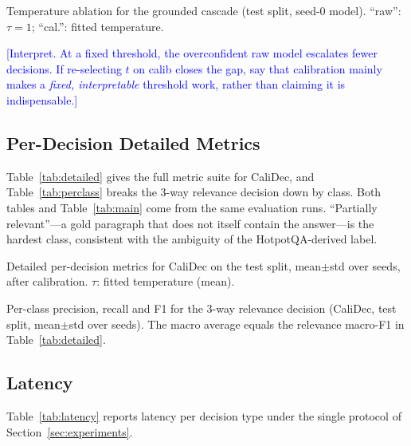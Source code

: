 \documentclass[twocolumn]{ICCKjournal}
\newcommand{\revnote}[1]{\textcolor{blue}{[#1]}}
\begin{document}
\begin{table}[H]
\caption{Temperature ablation for the grounded cascade (test split, seed-0 model). ``raw'': $\tau=1$; ``cal.'': fitted temperature.}
\label{tab:ablationtemp}
\centering
\small
\begin{adjustbox}{max width=\linewidth}

\end{adjustbox}
\end{table}

\revnote{Interpret. At a fixed threshold, the overconfident raw model escalates fewer decisions. If re-selecting $t$ on calib closes the gap, say that calibration mainly makes a \emph{fixed, interpretable} threshold work, rather than claiming it is indispensable.}

\subsection{Per-Decision Detailed Metrics}
\label{sec:detailed}
Table~\ref{tab:detailed} gives the full metric suite for CaliDec, and Table~\ref{tab:perclass} breaks the 3-way relevance decision down by class. Both tables and Table~\ref{tab:main} come from the same evaluation runs. ``Partially relevant''---a gold paragraph that does not itself contain the answer---is the hardest class, consistent with the ambiguity of the HotpotQA-derived label.

\begin{table}[H]
\caption{Detailed per-decision metrics for CaliDec on the test split, mean{\scriptsize$\pm$std} over seeds, after calibration. $\tau$: fitted temperature (mean).}
\label{tab:detailed}
\centering
\small
\begin{adjustbox}{max width=\linewidth}

\end{adjustbox}
\end{table}

\begin{table}[H]
\caption{Per-class precision, recall and F1 for the 3-way relevance decision (CaliDec, test split, mean{\scriptsize$\pm$std} over seeds). The macro average equals the relevance macro-F1 in Table~\ref{tab:detailed}.}
\label{tab:perclass}
\centering
\small
\begin{adjustbox}{max width=\linewidth}

\end{adjustbox}
\end{table}

\subsection{Latency}
\label{sec:latency}
Table~\ref{tab:latency} reports latency per decision type under the single protocol of Section~\ref{sec:experiments}.
\end{document}
